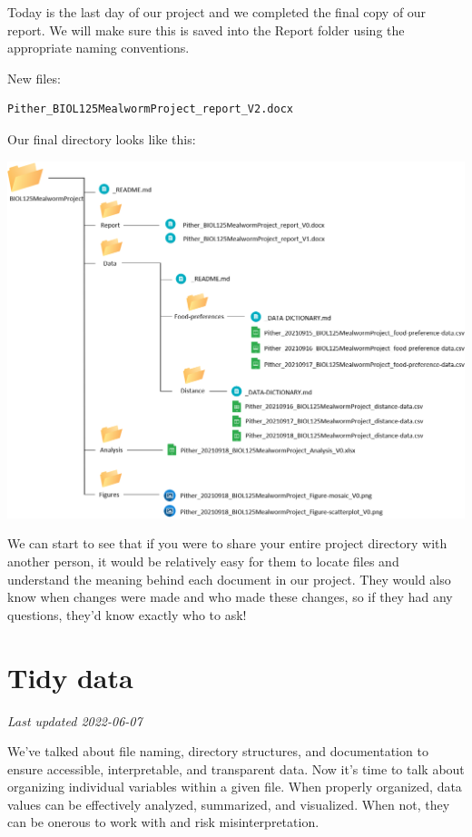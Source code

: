 \documentclass[
]{book}
\begin{document}
Today is the last day of our project and we completed the final copy of our report. We will make sure this is saved into the Report folder using the appropriate naming conventions.

New files:

\begin{verbatim}
Pither_BIOL125MealwormProject_report_V2.docx
\end{verbatim}

Our final directory looks like this:

\includegraphics{images/DS_directory-example-5.png}

We can start to see that if you were to share your entire project directory with another person, it would be relatively easy for them to locate files and understand the meaning behind each document in our project. They would also know when changes were made and who made these changes, so if they had any questions, they'd know exactly who to ask!

\hypertarget{tidy-data}{%
\chapter{Tidy data}\label{tidy-data}}

\emph{Last updated 2022-06-07}

We've talked about file naming, directory structures, and documentation to ensure accessible, interpretable, and transparent data. Now it's time to talk about organizing individual variables within a given file. When properly organized, data values can be effectively analyzed, summarized, and visualized. When not, they can be onerous to work with and risk misinterpretation.
\end{document}
